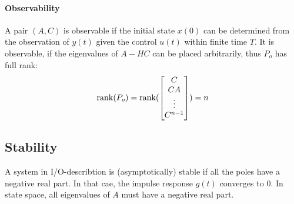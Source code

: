 \paragraph{Observability}A pair $(A,C)$ is observable if the initial state $x(0)$ can
be determined from the observation of $y(t)$ given the control $u(t)$ within finite time $T$.
It is observable, if the eigenvalues of $A-HC$ can be placed arbitrarily, thus $P_o$ has full rank:
\[
    \operatorname{rank}(P_o) = \operatorname{rank}(
        \begin{bmatrix}
            C \\ C A \\ \vdots \\ C^{n-1}
        \end{bmatrix}
    ) = n
\]

\subsection{Stability}
A system in I/O-describtion is (asymptotically) stable if all the poles have a negative real part.
In that cae, the impulse response $g(t)$ converges to $0$.
In state space, all eigenvalues of $A$ must have a negative real part.
